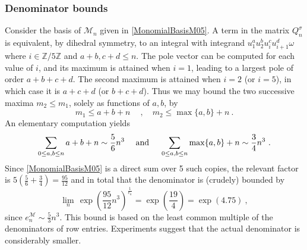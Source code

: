 \documentclass[a4paper,10pt]{amsart}
\theoremstyle{definition}
\theoremstyle{remark}
\numberwithin{equation}{section}
\newcommand{\Z}{\mathbb Z}
\newcommand{\0}{\color{blue}{\mathsf{0}}}
\begin{document}
\subsubsection{Denominator bounds}
Consider the basis of $\mathcal{M}_n$ given in \eqref{MonomialBasisM05}. A term in the matrix $Q^{\sigma}_n$ is equivalent, by dihedral symmetry, to an integral  with integrand $u_1^{a} u_2^{b} u_i^c u_{i+1}^d \omega$ where $i \in \Z/5\Z$ and $a+b, c+d\leq n$.  The pole vector can be computed for each value of $i$, and its maximum is attained when $i=1$, leading to a largest pole of order $a+b+c+d$. The second maximum is attained when $i=2$ (or $i=5$), in which case it is $a+c+d$ (or $b+c+d$). Thus we may bound the two successive maxima $m_2\leq m_1$, solely as functions of $a,b$, by 
\[ m_1 \leq  a+b +n\quad \ , \quad  m_2 \leq \max\{a,b\} +n \ .\]
An elementary computation yields
\[ \sum_{0\leq a, b\leq n} a+b+n \sim \frac{5}{6} n^3 \quad \hbox{ and } \quad  \sum_{0\leq a, b\leq n} \max\{a,b\}+n \sim \frac{3}{4} n^3\ . \] 
Since \eqref{MonomialBasisM05} is a direct sum over  5 such copies,  the relevant factor is $ 5(\frac{5}{6}+\frac{3}{4}) = \frac{95}{12}$ and  
in total that the denominator is (crudely) bounded by 
\begin{equation} \label{denboundM05} \lim_n \,  \exp \left( \frac{95}{12} n^3\right)^{\frac{1}{e_n}} = \exp \left( \frac{19}{4}\right) = \exp(4.75) \ ,\end{equation}
since $  e^{\mathcal{M}}_n  \sim \frac{5}{3}n^3$.
This bound is based on the least common multiple of the denominators of row entries. Experiments suggest that  the actual denominator is considerably smaller.
\end{document}
